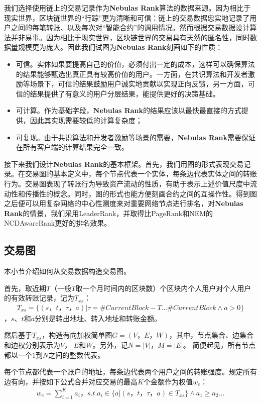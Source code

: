 我们选择使用链上的交易记录作为\textbf{Nebulas Rank}算法的数据来源。因为相比于现实世界，区块链世界的“行踪”更为清晰和可信：链上的交易数据忠实地记录了用户之间的每笔转账、以及每次对“智能合约”的调用情况。然而根据交易数据设计算法并非易事。因为相比于现实世界，区块链世界的交易具有天然的匿名性，同时数据量规模更为庞大。因此我们试图为\textbf{Nebulas Rank}刻画如下的性质：
\begin{itemize}
	\item 可信。实体如果要提高自己的价值，必须付出一定的成本，这样可以确保算法的结果能够甄选出真正具有较高价值的用户。一方面，在共识算法和开发者激励等场景下，可信的结果鼓励用户诚实地贡献以实现正向反馈，另一方面，可信的结果提供了有意义的用户分层结果，能提供更好的决策基础。
	\item 可计算。作为基础字段，\textbf{Nebulas Rank}的结果应该以最快最直接的方式提供，因此其实现需要较低的计算复杂度；
	\item 可复现。由于共识算法和开发者激励等场景的需要，\textbf{Nebulas Rank}需要保证在所有客户端的计算结果完全一致。
\end{itemize}

接下来我们设计\textbf{Nebulas Rank}的基本框架。首先，我们用图的形式表现交易记录。在交易图的基本定义中，每个节点代表一个实体，每条边代表实体之间的转账行为\cite{Tschorsch2015}。交易图表现了转账行为导致资产流动的性质，有助于表示上述价值尺度中流动性和传播性的概念。同时，图的形式也能方便刻画合约之间的互操作性。得到图之后便可以用复杂网络的中心性测度来对重要网络节点进行排名，对\textbf{Nebulas Rank}的情景，我们采用LeaderRank\cite{Chen2013}\cite{Li2014}，并取得比PageRank和NEM\cite{nem}的NCDAwareRank更好的排名效果。

\subsection{交易图} \label{subsec:txg}
本小节介绍如何从交易数据构造交易图。

首先，取近期$T$（一般$T$取一个月时间内的区块数）个区块内个人用户对个人用户的有效转账记录，记为$T_{xs}$：
\begin{align}
T_{xs} = \{(s，t，\tau， a)| \tau = \#CurrentBlock-T \dots \#CurrentBlock \land a > 0 \}
\end{align}
，$s$、$t$和$a$分别是转出地址、转入地址和转账金额。

然后基于$T_{xs}$，构造有向加权简单图$G=(V， E， W)$，其中，节点集合、边集合和边权分别表示为$V$， $E$和$W$。另外，记$N = |V|$，$M = |E|$。 简便起见，所有节点都以一个$1$到$N$之间的整数代表。

每个节点都代表一个账户的地址，每条边代表两个用户之间的转账强度。规定所有边有向，并按如下公式合并对应交易的最高$K$个金额作为权值$w_e$：
\begin{align}\label{formula:edgeweight}
w_e = \sum_{i=1}^K a_i， s.t. a_i \in \{a|(s，t，\tau，a) \in T_{xs} \} \land a_1 \geq a_2 \dots
\end{align}

